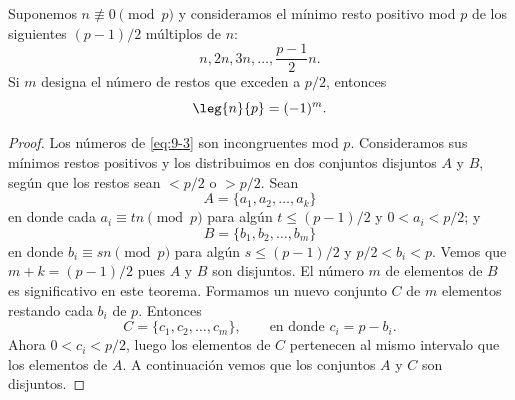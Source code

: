 \documentclass[12pt,a4paper]{book}
\begin{document}
    \begin{teorema}\label{teo:9-6}
        Suponemos $n\not\equiv0\pmod{p}$ y consideramos el mínimo resto positivo mod $p$
        de los siguientes $(p-1)/2$ múltiplos de $n$:
        \begin{equation}\label{eq:9-3}
            n,2n,3n,\dots,\frac{p-1}{2}n.
        \end{equation}
        Si $m$ designa el número de restos que exceden a $p/2$, entonces
        \begin{equation*}
            \leg{n}{p}=(-1)^{m}.
        \end{equation*}
    \end{teorema}

    \begin{proof}
        Los números de \eqref{eq:9-3} son incongruentes mod $p$. Consideramos sus mínimos
        restos positivos y los distribuimos en dos conjuntos disjuntos $A$ y $B$, según que
        los restos sean $<p/2$ o $>p/2$. Sean
        \begin{equation*}
            A=\{a_{1},a_{2},\dots,a_{k}\}
        \end{equation*}
        en donde cada $a_{i}\equiv tn\pmod{p}$ para algún $t\leq(p-1)/2$ y $0<a_{i}<p/2$; y
        \begin{equation*}
            B=\{b_{1},b_{2},\dots,b_{m}\}
        \end{equation*}
        en donde $b_{i}\equiv sn\pmod{p}$ para algún $s\leq(p-1)/2$ y $p/2<b_{i}<p$. Vemos que
        $m+k=(p-1)/2$ pues $A$ y $B$ son disjuntos. El número $m$ de elementos de $B$ es
        significativo en este teorema. Formamos un nuevo conjunto $C$ de $m$ elementos
        restando cada $b_{i}$ de $p$. Entonces
        \begin{equation*}
            C=\{c_{1},c_{2},\dots,c_{m}\},\qquad\text{en donde }c_{i}=p-b_{i}.
        \end{equation*}
        Ahora $0<c_{i}<p/2$, luego los elementos de $C$ pertenecen al mismo intervalo que los
        elementos de $A$. A continuación vemos que los conjuntos $A$ y $C$ son disjuntos.


\end{proof}
\end{document}
